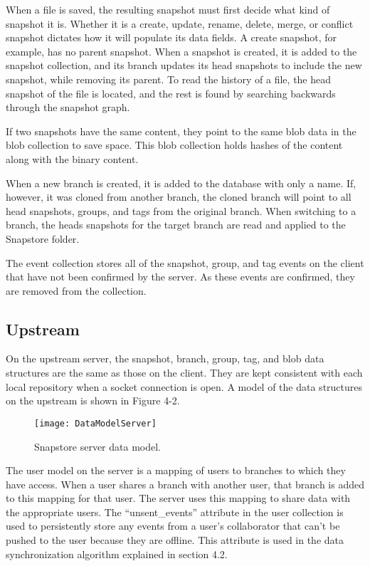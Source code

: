 When a file is saved, the resulting snapshot must first decide what kind of snapshot it is. Whether it is a create, update, rename, delete, merge, or conflict snapshot dictates how it will populate its data fields. A create snapshot, for example, has no parent snapshot. When a snapshot is created, it is added to the snapshot collection, and its branch updates its head snapshots to include the new snapshot, while removing its parent. To read the history of a file, the head snapshot of the file is located, and the rest is found by searching backwards through the snapshot graph.

If two snapshots have the same content, they point to the same blob data in the blob collection to save space. This blob collection holds hashes of the content along with the binary content.

When a new branch is created, it is added to the database with only a name. If, however, it was cloned from another branch, the cloned branch will point to all head snapshots, groups, and tags from the original branch. When switching to a branch, the heads snapshots for the target branch are read and applied to the Snapstore folder.

The event collection stores all of the snapshot, group, and tag events on the client that have not been confirmed by the server. As these events are confirmed, they are removed from the collection.

\subsection{Upstream}

On the upstream server, the snapshot, branch, group, tag, and blob data structures are the same as those on the client. They are kept consistent with each local repository when a socket connection is open. A model of the data structures on the upstream is shown in Figure 4-2.

\begin{figure}
\texttt{[image: DataModelServer]}
\caption{Snapstore server data model.}
\label{arm:fig1}
\end{figure}

The user model on the server is a mapping of users to branches to which they have access. When a user shares a branch with another user, that branch is added to this mapping for that user. The server uses this mapping to share data with the appropriate users. The ``unsent\_events'' attribute in the user collection is used to persistently store any events from a user's collaborator that can't be pushed to the user because they are offline. This attribute is used in the data synchronization algorithm explained in section 4.2.

